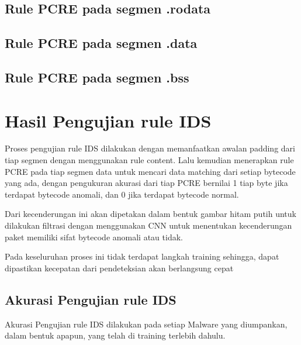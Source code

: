 \documentclass{article}
\begin{document}
\subsection{Rule PCRE pada segmen .rodata}
\subsection{Rule PCRE pada segmen .data}
\subsection{Rule PCRE pada segmen .bss}
\section{Hasil Pengujian rule IDS}
Proses pengujian rule IDS dilakukan dengan memanfaatkan awalan padding dari tiap segmen dengan menggunakan rule content. Lalu kemudian menerapkan rule PCRE pada tiap segmen data untuk mencari data matching dari setiap bytecode yang ada, dengan pengukuran akurasi dari tiap PCRE bernilai 1 tiap byte jika terdapat bytecode anomali, dan 0 jika terdapat bytecode normal.
\par
Dari kecenderungan ini akan dipetakan dalam bentuk gambar hitam putih untuk dilakukan filtrasi dengan menggunakan CNN untuk menentukan kecenderungan paket memiliki sifat bytecode anomali atau tidak.
\par
Pada keseluruhan proses ini tidak terdapat langkah training sehingga, dapat dipastikan kecepatan dari pendeteksian akan berlangsung cepat
\subsection{Akurasi Pengujian rule IDS}
Akurasi Pengujian rule IDS dilakukan pada setiap Malware yang diumpankan, dalam bentuk apapun, yang telah di training terlebih dahulu.
\end{document}
